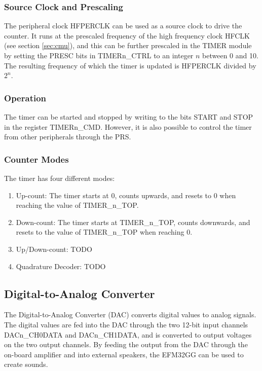 \subsubsection{Source Clock and Prescaling} The peripheral clock HFPERCLK can be used as a source clock to drive the counter. It runs at the prescaled frequency of the high frequency clock HFCLK (see section \ref{sec:cmu}), and this can be further prescaled in the TIMER module by setting the PRESC bits in TIMERn\_CTRL to an integer $n$ between 0 and 10. The resulting frequency of which the timer is updated is HFPERCLK divided by $2^{n}$.

\subsubsection{Operation}
The timer can be started and stopped by writing to the bits START and STOP in the register TIMERn\_CMD. However, it is also possible to control the timer from other peripherals through the PRS.

\subsubsection{Counter Modes}
The timer has four different modes:
\begin{enumerate}
	\item Up-count: The timer starts at 0, counts upwards, and resets to 0 when reaching the value of TIMER\_n\_TOP.
	\item Down-count: The timer starts at TIMER\_n\_TOP, counts downwards, and resets to the value of TIMER\_n\_TOP when reaching 0.

	\item Up/Down-count: TODO %
	\item Quadrature Decoder: TODO %
\end{enumerate}


\subsection{Digital-to-Analog Converter}

The Digital-to-Analog Converter (DAC) converts digital values to analog signals. The digital values are fed into the DAC through the two 12-bit input channels DACn\_CH0DATA and DACn\_CH1DATA, and is converted to output voltages on the two output channels. By feeding the output from the DAC through the on-board amplifier and into external speakers, the EFM32GG can be used to create sounds.

